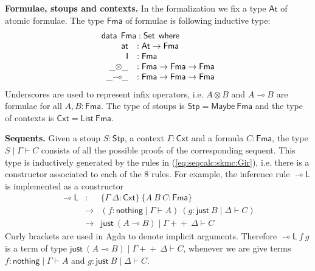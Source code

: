 \documentclass[sn-mathphys-num]{sn-jnl}%
\newcommand{\GG}{\Gamma}
\newcommand{\GD}{\Delta}
\newcommand{\vd}{\vdash}
\newcommand{\ot}{\otimes}
\newcommand{\lolli}{\multimap}
\newcommand{\lleft}{{\lolli}\mathsf{L}}
\newcommand{\unit}{\mathsf{I}}
\newcommand{\List}{\mathsf{List}}
\newcommand{\Maybe}{\mathsf{Maybe}}
\newcommand{\nothing}{\mathsf{nothing}}
\newcommand{\just}{\mathsf{just}}
\newcommand{\append}{+\!\!+}
\newcommand{\At}{\mathsf{At}}
\newcommand{\at}{\mathsf{at}}
\newcommand{\Fma}{\mathsf{Fma}}
\newcommand{\data}{\mathsf{data}}
\newcommand{\where}{\mathsf{where}}
\newcommand{\Set}{\mathsf{Set}}
\newcommand{\Stp}{\mathsf{Stp}}
\newcommand{\Cxt}{\mathsf{Cxt}}
\theoremstyle{thmstyleone}%
\theoremstyle{thmstyletwo}%
\theoremstyle{thmstylethree}%
\begin{document}
\noindent\textbf{Formulae, stoups and contexts.} In the formalization we fix a type $\At$ of atomic formulae.
The type $\Fma$ of formulae is following inductive type:
\[
\begin{array}{rl}
  \multicolumn{2}{l}{\data \:\:  \Fma : \Set \:\: \where} \\
  \;\; \at &: \At \to \Fma \\
  \;\; \unit &: \Fma \\
  \;\; \_{\ot}\_ &: \Fma \to \Fma \to \Fma \\
  \;\; \_{\lolli}\_ &: \Fma \to \Fma \to \Fma  
\end{array}
\]
Underscores are used to represent infix operators, i.e. $A \ot B$ and $A \lolli B$ are formulae for all $A,B : \Fma$.
The type of stoups is $\Stp = \Maybe ~\Fma$ and the type of contexts is $\Cxt = \List ~\Fma$.

\noindent\textbf{Sequents.} %
Given a stoup $S : \Stp$, a context $\Gamma : \Cxt$ and a formula $C : \Fma$, the type $S \mid \Gamma \vdash C$ consists of all the possible proofs of the corresponding sequent.
This type is inductively generated by the rules in (\ref{eq:seqcalc:skmc:Gir}), i.e. there is a constructor associated to each of the 8 rules.
For example, the inference rule $\lleft$ is implemented as a constructor
\[
\begin{array}{rcl}
\lleft & : & \{\Gamma ~ \Delta : \Cxt \} ~ \{A ~ B ~ C : \Fma\} \\
&\to&(f : \nothing \mid \GG \vd A) ~ (g : \just ~B \mid \GD \vd C) \\
&\to& \just ~(A \lolli B) \mid \GG \append ~\GD \vd C
\end{array}
\]
Curly brackets are used in Agda to denote implicit arguments. Therefore $\lleft ~f ~g$ is a term of type $\just ~(A \lolli B) \mid \GG \append~ \GD \vd C$, whenever we are give terms $f : \nothing \mid \GG \vd A$ and $g : \just ~B \mid \GD \vd C$. 
\end{document}
